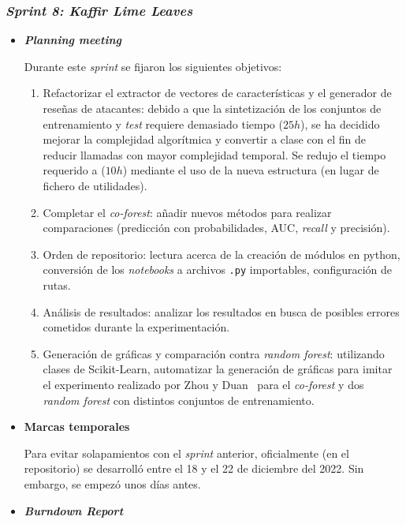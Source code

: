 \subsubsection{\textit{Sprint 8: Kaffir Lime Leaves}}
\begin{itemize}
	\item \textbf{\textit{Planning meeting}}
	
	Durante este \textit{sprint} se fijaron los siguientes objetivos:
			\begin{enumerate}
			\item Refactorizar el extractor de vectores de características y el generador de reseñas de atacantes: debido a que la sintetización de los conjuntos de entrenamiento y \textit{test} requiere demasiado tiempo ($25h$), se ha decidido mejorar la complejidad algorítmica y convertir a clase con el fin de reducir llamadas con mayor complejidad temporal. Se redujo el tiempo requerido a ($10h$) mediante el uso de la nueva estructura (en lugar de fichero de utilidades).
			\item Completar el \textit{co-forest}: añadir nuevos métodos para realizar comparaciones (predicción con probabilidades, AUC, \textit{recall} y precisión).
			\item Orden de repositorio: lectura acerca de la creación de módulos en python, conversión de los \textit{notebooks} a archivos \texttt{.py} importables, configuración de rutas.
			\item Análisis de resultados: analizar los resultados en busca de posibles errores cometidos durante la experimentación.
			\item Generación de gráficas y comparación contra \textit{random forest}: utilizando clases de Scikit-Learn, automatizar la generación de gráficas para imitar el experimento realizado por Zhou y Duan~\cite{zhou2021SemisupervisedRecommendationAttack} para el \textit{co-forest} y dos \textit{random forest} con distintos conjuntos de entrenamiento.
			\end{enumerate}
		
	\item \textbf{Marcas temporales}	
	
	Para evitar solapamientos con el \textit{sprint} anterior, oficialmente (en el repositorio) se desarrolló entre el 18 y el 22 de diciembre del 2022. Sin embargo, se empezó unos días antes.	
	
	\item \textbf{\textit{Burndown Report}}
	

\end{itemize}
